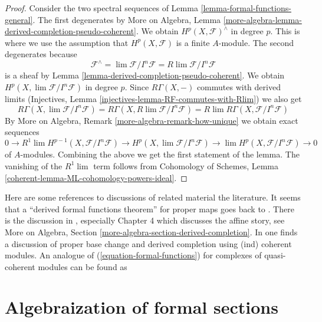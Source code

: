 \begin{proof}
Consider the two spectral sequences of
Lemma \ref{lemma-formal-functions-general}.
The first degenerates by More on Algebra, Lemma
\ref{more-algebra-lemma-derived-completion-pseudo-coherent}.
We obtain $H^p(X, \mathcal{F})^\wedge$ in degree $p$.
This is where we use the assumption that $H^p(X, \mathcal{F})$ is
a finite $A$-module. The second degenerates because
$$
\mathcal{F}^\wedge = \lim \mathcal{F}/I^n\mathcal{F} =
R\lim \mathcal{F}/I^n\mathcal{F}
$$
is a sheaf by Lemma \ref{lemma-derived-completion-pseudo-coherent}.
We obtain $H^p(X, \lim \mathcal{F}/I^n\mathcal{F})$ in degree $p$.
Since $R\Gamma(X, -)$ commutes with derived limits
(Injectives, Lemma \ref{injectives-lemma-RF-commutes-with-Rlim})
we also get
$$
R\Gamma(X, \lim \mathcal{F}/I^n\mathcal{F}) =
R\Gamma(X, R\lim \mathcal{F}/I^n\mathcal{F}) =
R\lim R\Gamma(X, \mathcal{F}/I^n\mathcal{F})
$$
By More on Algebra, Remark
\ref{more-algebra-remark-how-unique}
we obtain exact sequences
$$
0 \to
R^1\lim H^{p - 1}(X, \mathcal{F}/I^n\mathcal{F}) \to
H^p(X, \lim \mathcal{F}/I^n\mathcal{F}) \to
\lim H^p(X, \mathcal{F}/I^n\mathcal{F}) \to 0
$$
of $A$-modules. Combining the above we get the first statement of the lemma.
The vanishing of the $R^1\lim$ term follows from
Cohomology of Schemes, Lemma \ref{coherent-lemma-ML-cohomology-powers-ideal}.
\end{proof}

\begin{remark}
\label{remark-references}
Here are some references to discussions of related material the literature.
It seems that a ``derived formal functions theorem'' for proper maps
goes back to \cite[Theorem 6.3.1]{lurie-thesis}.
There is the discussion in \cite{dag12}, especially
Chapter 4 which discusses the affine story, see
More on Algebra, Section \ref{more-algebra-section-derived-completion}.
In \cite[Section 2.9]{G-R} one finds a discussion of proper base change and
derived completion using (ind) coherent modules.
An analogue of (\ref{equation-formal-functions})
for complexes of quasi-coherent modules can be found as
\cite[Theorem 6.5]{HL-P}
\end{remark}






\section{Algebraization of formal sections}
\label{section-algebraization-sections}

